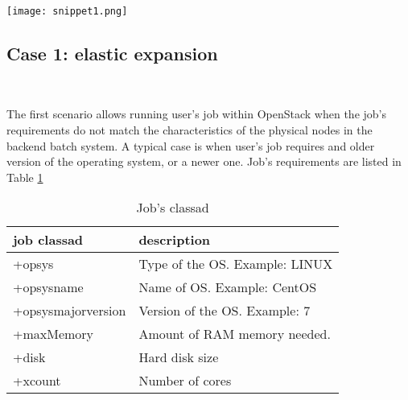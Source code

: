 \documentclass[a4paper]{jpconf}
\begin{document}

\begin{snippet}[h]
    \renewcommand\figurename{Snippet}
    \centering
    \texttt{[image: snippet1.png]}
    \caption{Snippet 1}
    \label{fig:snippet1}
\end{snippet}


\subsection{Case 1: elastic expansion}

~

The first scenario allows running user's job within OpenStack when
the job's requirements do not match the characteristics of the physical nodes in
the backend batch system.
A typical case is when user's job requires and older version of the operating
system, or a newer one.
Job's requirements are listed in Table \ref{table:classad1}


\begin{table}[h]
\centering
\begin{tabular}{ l l }
  \hline
  \textbf{job classad} & \textbf{description} \\
  \hline
  +opsys & Type of the OS. Example: LINUX  \\
  +opsysname & Name of OS. Example: CentOS \\
  +opsysmajorversion & Version of the OS. Example: 7 \\
  +maxMemory & Amount of RAM memory needed. \\
  +disk & Hard disk size \\
  +xcount & Number of cores \\
  \hline
\end{tabular}
\caption{Job's classad}
\label{table:classad1}
\end{table}
\end{document}

